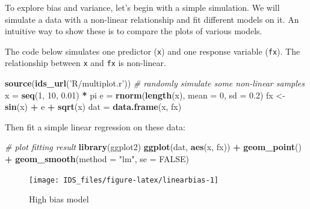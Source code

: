 \documentclass[12pt,]{krantz}
\newenvironment{Shaded}{\begin{snugshade}}{\end{snugshade}}
\newcommand{\KeywordTok}[1]{\textcolor[rgb]{0.13,0.29,0.53}{\textbf{#1}}}
\newcommand{\DataTypeTok}[1]{\textcolor[rgb]{0.13,0.29,0.53}{#1}}
\newcommand{\DecValTok}[1]{\textcolor[rgb]{0.00,0.00,0.81}{#1}}
\newcommand{\FloatTok}[1]{\textcolor[rgb]{0.00,0.00,0.81}{#1}}
\newcommand{\StringTok}[1]{\textcolor[rgb]{0.31,0.60,0.02}{#1}}
\newcommand{\CommentTok}[1]{\textcolor[rgb]{0.56,0.35,0.01}{\textit{#1}}}
\newcommand{\OtherTok}[1]{\textcolor[rgb]{0.56,0.35,0.01}{#1}}
\newcommand{\OperatorTok}[1]{\textcolor[rgb]{0.81,0.36,0.00}{\textbf{#1}}}
\newcommand{\NormalTok}[1]{#1}
\theoremstyle{definition}
\theoremstyle{definition}
\theoremstyle{definition}
\theoremstyle{remark}
\begin{document}
To explore bias and variance, let's begin with a simple simulation. We
will simulate a data with a non-linear relationship and fit different
models on it. An intuitive way to show these is to compare the plots of
various models.

The code below simulates one predictor (\texttt{x}) and one response
variable (\texttt{fx}). The relationship between \texttt{x} and
\texttt{fx} is non-linear.

\begin{Shaded}
\begin{Highlighting}[]
\KeywordTok{source}\NormalTok{(}\KeywordTok{ids_url}\NormalTok{(}\StringTok{'R/multiplot.r'}\NormalTok{))}
\CommentTok{# randomly simulate some non-linear samples}
\NormalTok{x =}\StringTok{ }\KeywordTok{seq}\NormalTok{(}\DecValTok{1}\NormalTok{, }\DecValTok{10}\NormalTok{, }\FloatTok{0.01}\NormalTok{) }\OperatorTok{*}\StringTok{ }\NormalTok{pi}
\NormalTok{e =}\StringTok{ }\KeywordTok{rnorm}\NormalTok{(}\KeywordTok{length}\NormalTok{(x), }\DataTypeTok{mean =} \DecValTok{0}\NormalTok{, }\DataTypeTok{sd =} \FloatTok{0.2}\NormalTok{)}
\NormalTok{fx <-}\StringTok{ }\KeywordTok{sin}\NormalTok{(x) }\OperatorTok{+}\StringTok{ }\NormalTok{e }\OperatorTok{+}\StringTok{ }\KeywordTok{sqrt}\NormalTok{(x)}
\NormalTok{dat =}\StringTok{ }\KeywordTok{data.frame}\NormalTok{(x, fx)}
\end{Highlighting}
\end{Shaded}

Then fit a simple linear regression on these data:

\begin{Shaded}
\begin{Highlighting}[]
\CommentTok{# plot fitting result}
\KeywordTok{library}\NormalTok{(ggplot2)}
\KeywordTok{ggplot}\NormalTok{(dat, }\KeywordTok{aes}\NormalTok{(x, fx)) }\OperatorTok{+}\StringTok{ }\KeywordTok{geom_point}\NormalTok{() }\OperatorTok{+}\StringTok{ }\KeywordTok{geom_smooth}\NormalTok{(}\DataTypeTok{method =} \StringTok{"lm"}\NormalTok{, }\DataTypeTok{se =} \OtherTok{FALSE}\NormalTok{)}
\end{Highlighting}
\end{Shaded}

\begin{figure}

{\centering \texttt{[image: IDS\_files/figure-latex/linearbias-1]} 

}

\caption{High bias model}\label{fig:linearbias}
\end{figure}
\end{document}
